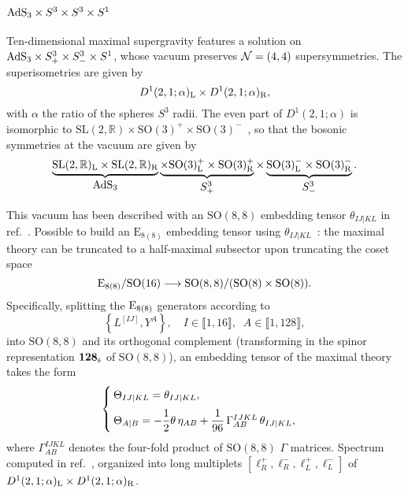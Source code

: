 \documentclass[11pt]{article}
\newcommand{\SO}{\ensuremath{\mathrm{SO}}\xspace}
\newcommand{\SL}{\ensuremath{\mathrm{SL}}\xspace}
\newcommand{\E}{\ensuremath{\mathrm{E}}\xspace}
\begin{document}
\section{\texorpdfstring{${\rm AdS}_{3}\times S^{3}\times S^{3}\times S^{1}$}{AdS3xS3xS3xS1}}
Ten-dimensional maximal supergravity features a solution on ${\rm AdS}_{3}\times S^{3}_{+}\times S^{3}_{-}\times S^{1}$, whose vacuum preserves ${\cal N}=(4,4)$ supersymmetries. The superisometries are given by
\begin{equation}
  D^{1}(2,1;\alpha)_{\rm L}\times D^{1}(2,1;\alpha)_{\rm R},   
\end{equation}
with $\alpha$ the ratio of the spheres $S^{3}$ radii. The even part of $D^{1}(2,1;\alpha)$ is isomorphic to $\SL(2,\mathbb{R})\times\SO(3)^{+}\times\SO(3)^{-}$~\cite{Gunaydin:1986fe}, so that the bosonic symmetries at the vacuum are given by
\begin{equation}
  \underbrace{\SL(2,\mathbb{R})_{\rm L}\times\SL(2,\mathbb{R})_{\rm R}}_{\textstyle {\rm AdS}_{3}}\underbrace{\times\SO(3)^{+}_{\rm L}\times\SO(3)^{+}_{\rm R}}_{\textstyle S^{3}_{+}}\times\underbrace{\SO(3)^{-}_{\rm L}\times\SO(3)^{-}_{\rm R}}_{\textstyle S^{3}_{-}}.
\end{equation}

This vacuum has been described with an $\SO(8,8)$ embedding tensor $\theta_{IJ\vert KL}$ in ref.~\cite{Eloy:2020uix}. Possible to build an $\E_{8(8)}$ embedding tensor using $\theta_{IJ\vert KL}$~\cite{Deger:2019tem}: the maximal theory can be truncated to a half-maximal subsector upon truncating the coset space
\begin{equation} \label{eq:E8SO88}
{\rm E}_{8(8)}/{\rm SO}(16) \longrightarrow \SO(8,8)/(\SO(8)\times\SO(8)).
\end{equation}
Specifically, splitting the ${\rm E}_{8(8)}$ generators according to
\begin{equation}
  \left\{L^{[IJ]}, Y^{A}\right\},\quad I\in\llbracket1,16\rrbracket,\;\; A\in\llbracket1,128\rrbracket,
\end{equation}
into $\SO(8,8)$ and its orthogonal complement (transforming in the spinor representation ${\bf 128}_{\rm s}$ of $\SO(8,8)$), an embedding tensor of the maximal theory takes the form
\begin{equation} \label{eq:embmax}
  \begin{cases}
  \Theta_{IJ|KL} = \theta_{IJ|KL},\medskip\\
  \Theta_{A|B} =-\dfrac{1}{2}\theta\,\eta_{AB}+\dfrac{1}{96}\,\Gamma^{IJKL}_{AB}\,\theta_{IJ\vert KL},
  \end{cases}
\end{equation}
where $\Gamma^{IJKL}_{AB}$ denotes the four-fold product of $\SO(8,8)$ $\Gamma$ matrices. Spectrum computed in ref.~\cite{Eberhardt:2017fsi}, organized into long multiplets $\left[\ell^{+}_{R},\ell^{-}_{R},\ell^{+}_{L},\ell^{-}_{L}\right]$ of $D^{1}(2,1;\alpha)_{\rm L}\times D^{1}(2,1;\alpha)_{\rm R}$.
\end{document}
